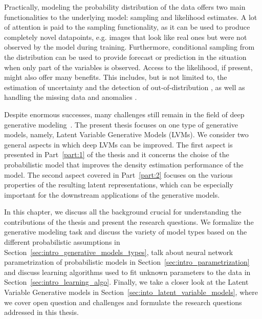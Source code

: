
Practically, modeling the probability distribution of the data offers two main functionalities to the underlying model: sampling and likelihood estimates. A lot of attention is paid to the sampling functionality, as it can be used to produce completely novel datapoints, e.g. images that look like real ones but were not observed by the model during training. Furthermore, conditional sampling from the distribution can be used to provide forecast or prediction in the situation when only part of the variables is observed. Access to the likelihood, if present, might also offer many benefits. This includes, but is not limited to, the estimation of uncertainty and the detection of out-of-distribution \cite{havtorn2021hierarchical, kadavath2022language}, as well as handling the missing data \cite{mattei2019miwae} and anomalies \citep{an2015variational}.

Despite enormous successes, many challenges still remain in the field of deep generative modeling~\citep{manduchi2024challenges}. The present thesis focuses on one type of generative models, namely, Latent Variable Generative Models (LVMs). We consider two general aspects in which deep LVMs can be improved. 
The first aspect is presented in Part~\ref{part:1} of the thesis and it concerns the choise of the probabilistic model that improves the density estimation performance of the model. 
The second aspect covered in Part~\ref{part:2} focuses on the various properties of the resulting latent representations, which can be especially important for the downstream applications of the generative models. 

In this chapter, we discuss all the background crucial for understanding the contributions of the thesis and present the research questions. We formalize the generative modeling task and discuss the variety of model types based on the different probabilistic assumptions in Section~\ref{sec:intro_generative_models_types}, talk about neural network parametrization of probabilistic models in Section~\ref{sec:intro_parametrization} and discuss learning algorithms used to fit unknown parameters to the data in Section~\ref{sec:intro_learning_algo}. Finally, we take a closer look at the Latent Variable Generative models in Section~\ref{sec:into_latent_variable_models}, where we cover open question and challenges and formulate the research questions addressed in this thesis.


